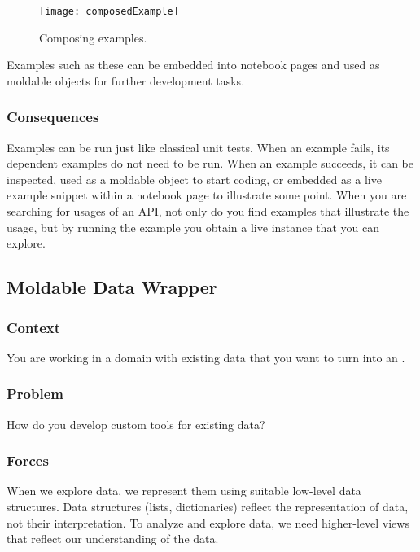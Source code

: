 \documentclass[sigconf]{acmart}
\newcommand{\pattern}[1]{\emph{\nameref{pat:#1}}\xspace}
\begin{document}
\begin{figure}[h]
  \texttt{[image: composedExample]}
  \caption{Composing examples.}
  \label{fig:composedExample}
\end{figure}

Examples such as these can be embedded into notebook pages and used as moldable objects for further development tasks.
    
\subsubsection*{Consequences}
Examples can be run just like classical unit tests.
When an example fails, its dependent examples do not need to be run.
When an example succeeds, it can be inspected, used as a moldable object to start coding, or embedded as a live example snippet within a notebook page to illustrate some point.
When you are searching for usages of an API, not only do you find examples that illustrate the usage, but by running the example you obtain a live instance that you can explore.

\subsection*{Moldable Data Wrapper}\label{pat:moldableDataWrapper}
\subsubsection*{Context}
You are working in a domain with existing data that you want to turn into an \pattern{explainableSystem}.

\subsubsection*{Problem}
How do you develop custom tools for existing data?

\subsubsection*{Forces}
When we explore data, we represent them using suitable low-level data structures.
Data structures (lists, dictionaries) reflect the representation of data, not their interpretation.
To analyze and explore data, we need higher-level views that reflect our understanding of the data.
\end{document}
